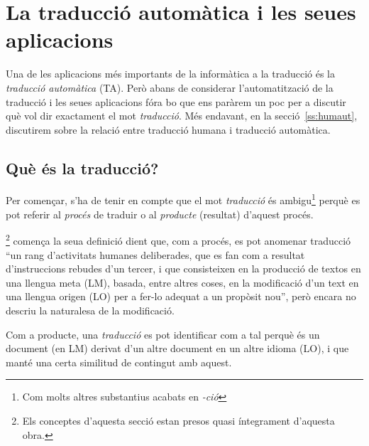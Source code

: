 \chapter{La traducció automàtica i les seues aplicacions}
\label{se:UTA} \label{se:TiTA} %

Una de les aplicacions més importants de la informàtica a la traducció
és la \emph{traducció automàtica} (TA). Però abans de considerar
l'automatització de la traducció i les seues aplicacions fóra bo que
ens paràrem un poc per a discutir què vol dir exactament el mot
\emph{traducció}. Més endavant, en la secció~\ref{ss:humaut},
discutirem sobre la relació entre traducció humana i traducció
automàtica.

\section{Què és la traducció?}
\label{ss:trad}

Per començar, s'ha de tenir en compte que el mot \emph{traducció} és
ambigu\footnote{Com molts altres substantius acabats en \emph{-ció}}
perquè es pot referir al \emph{procés} de traduir o al \emph{producte}
(resultat) d'aquest procés.

\citet{sager93b}\footnote{Els conceptes d'aquesta secció estan presos
  quasi íntegrament d'aquesta obra.} comença la seua definició dient
que, com a procés, es pot anomenar traducció ``un rang d'activitats
humanes deliberades, que es fan com a resultat d'instruccions rebudes
d'un tercer, i que consisteixen en la producció de textos en una
llengua meta (LM), basada, entre altres coses, en la modificació d'un
text en una llengua origen (LO) per a fer-lo adequat a un propòsit
nou'', però encara no descriu la naturalesa de la modificació.

Com a producte, una \emph{traducció} es pot identificar com a tal
perquè és un document (en LM) derivat d'un altre document en un altre
idioma (LO), i que manté una certa similitud de contingut amb aquest.


